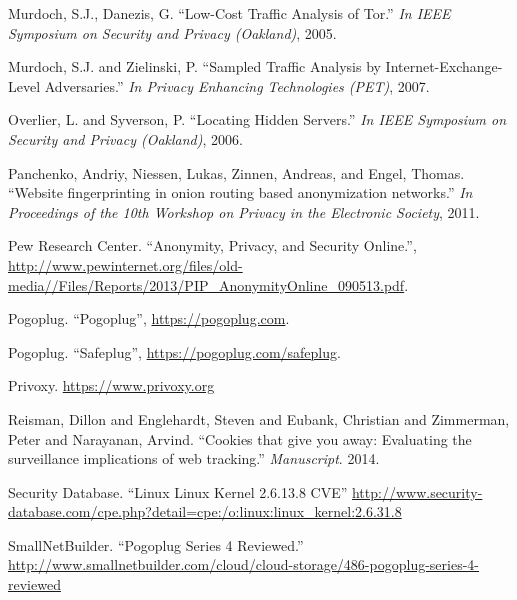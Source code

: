 \documentclass[conference]{IEEEtran}
\begin{document}
\begin{thebibliography}{1}
 Murdoch, S.J., Danezis, G.  ``Low-Cost Traffic Analysis of Tor.'' \emph{In IEEE Symposium on Security and Privacy (Oakland)}, 2005.

 Murdoch, S.J. and Zielinski, P.  ``Sampled Traffic Analysis by Internet-Exchange-Level Adversaries.'' \emph{In Privacy Enhancing Technologies (PET)}, 2007.

 Overlier, L. and Syverson, P.  ``Locating Hidden Servers.'' \emph{In IEEE Symposium on Security and Privacy (Oakland)}, 2006.

 Panchenko, Andriy, Niessen, Lukas, Zinnen, Andreas, and Engel, Thomas.  ``Website fingerprinting in onion routing based anonymization networks.'' \emph{In Proceedings of the 10th Workshop on Privacy in the Electronic Society}, 2011.


 Pew Research Center.  ``Anonymity, Privacy, and Security Online.'', \url{http://www.pewinternet.org/files/old-media//Files/Reports/2013/PIP_AnonymityOnline_090513.pdf}.

 Pogoplug. ``Pogoplug'', \url{https://pogoplug.com}.

 Pogoplug. ``Safeplug'', \url{https://pogoplug.com/safeplug}.

 Privoxy. \url{https://www.privoxy.org}


 Reisman, Dillon and Englehardt, Steven and Eubank, Christian and Zimmerman, Peter and Narayanan, Arvind.  ``Cookies that give you away: Evaluating the surveillance implications of web tracking.'' \emph{Manuscript}.  2014.

 Security Database. ``Linux Linux Kernel 2.6.13.8 CVE'' \url{http://www.security-database.com/cpe.php?detail=cpe:/o:linux:linux_kernel:2.6.31.8}


 SmallNetBuilder. ``Pogoplug Series 4 Reviewed.'' \url{http://www.smallnetbuilder.com/cloud/cloud-storage/486-pogoplug-series-4-reviewed}


\end{thebibliography}
\end{document}
